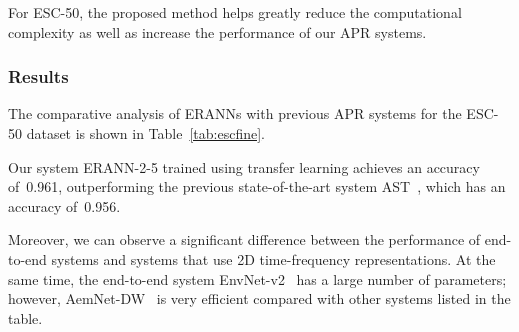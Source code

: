 \documentclass{article}
\begin{document}
\begin{sloppy}
For ESC-50, the proposed method helps greatly reduce the computational complexity as well as increase the performance of our APR systems.


\subsubsection{Results}
The comparative analysis of ERANNs with previous APR systems for the ESC-50 dataset is shown in Table~\ref{tab:escfine}.

\vspace{-1.5em}
\begin{table}[th]
  \caption{Comparison of APR systems for ESC-50}
  \centering
  \label{tab:escfine}
\end{table}

Our system \mbox{ERANN-2-5} trained using transfer learning achieves an accuracy of~0.961, outperforming the previous state-of-the-art system AST~\cite{gong21b_interspeech}, which has an accuracy of~0.956.

Moreover, we can observe a significant difference between the performance of end-to-end systems and systems that use 2D time-frequency representations. At the same time, the end-to-end system \mbox{EnvNet-v2}~\cite{tokozume2018learning} has a large number of parameters; however, \mbox{AemNet-DW}~\cite{9414229} is very efficient compared with other systems listed in the table.



\end{sloppy}
\end{document}
